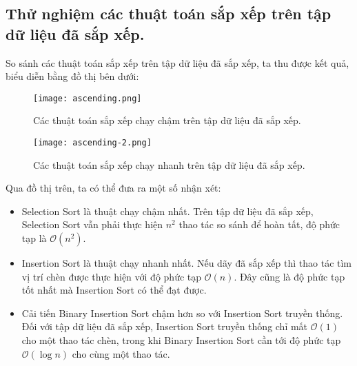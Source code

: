 \documentclass[]{article}
\begin{document}
\subsection{Thử nghiệm các thuật toán sắp xếp trên tập dữ liệu đã sắp xếp.}
So sánh các thuật toán sắp xếp trên tập dữ liệu đã sắp xếp, ta thu được kết quả, biểu diễn bằng đồ thị bên dưới:
\begin{figure}[H]
\centering
\texttt{[image: ascending.png]}
\caption{Các thuật toán sắp xếp chạy chậm trên tập dữ liệu đã sắp xếp.}
\end{figure}
\begin{figure}[H]
\centering
\texttt{[image: ascending-2.png]}
\caption{Các thuật toán sắp xếp chạy nhanh trên tập dữ liệu đã sắp xếp.}
\end{figure}
Qua đồ thị trên, ta có thể đưa ra một số nhận xét:
\begin{itemize}
\item Selection Sort là thuật chạy chậm nhất. Trên tập dữ liệu đã sắp xếp, Selection Sort vẫn phải thực hiện $n^2$ thao tác so sánh để hoàn tất, độ phức tạp là $\mathcal{O}(n^2)$.
\item Insertion Sort là thuật chạy nhanh nhất. Nếu dãy đã sắp xếp thì thao tác tìm vị trí chèn được thực hiện với độ phức tạp $\mathcal{O}(n)$. Đây cũng là độ phức tạp tốt nhất mà Insertion Sort có thể đạt được.
\item Cải tiến Binary Insertion Sort chậm hơn so với Insertion Sort truyền thống. Đối với tập dữ liệu đã sắp xếp, Insertion Sort truyền thống chỉ mất $\mathcal{O}(1)$ cho một thao tác chèn, trong khi Binary Insertion Sort cần tới độ phức tạp $\mathcal{O}(\log n)$ cho cùng một thao tác.
\end{itemize}
\end{document}
